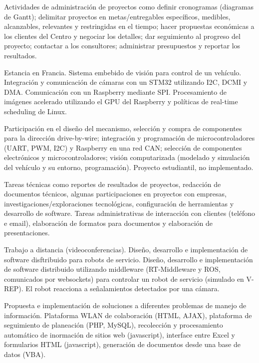 \documentclass[11pt,a4paper,sans]{moderncv}	%
\begin{document}
{Actividades de administración de proyectos como definir cronogramas (diagramas de Gantt); delimitar proyectos en metas/entregables específicos, medibles, alcanzables, relevantes y restringidas en el tiempo; hacer propuestas económicas a los clientes del Centro y negociar los detalles; dar seguimiento al progreso del proyecto; contactar a los consultores; administrar presupuestos y reportar los resultados.}

{Estancia en Francia. Sistema embebido de visión para control de un vehículo. Integración y comunicación de cámaras con un STM32 utilizando I2C, DCMI y DMA. Comunicación con un Raspberry mediante SPI. Procesamiento de imágenes acelerado utilizando el GPU del Raspberry y políticas de real-time scheduling de Linux.}

{Participación en el diseño del mecanismo, selección y compra de componentes para la dirección drive-by-wire; integración y programación de microcontroladores (UART, PWM, I2C) y Raspberry en una red CAN; selección de componentes electrónicos y microcontroladores; visión computarizada (modelado y simulación del vehículo y su entorno, programación). Proyecto estudiantil, no implementado.}

{Tareas técnicas como reportes de resultados de proyectos, redacción de documentos técnicos, algunas participaciones en proyectos con empresas, investigaciones/exploraciones tecnológicas, configuración de herramientas y desarrollo de software. Tareas administrativas de interacción con clientes (teléfono e email), elaboración de formatos para documentos y elaboración de presentaciones.}

{Trabajo a distancia (videoconferencias). Diseño, desarrollo e implementación de software disftribuido para robots de servicio. Diseño, desarrollo e implementación de software distribuido utilizando middleware (RT-Middleware y ROS, comunicados por websockets) para controlar un robot de servicio (simulado en V-REP). El robot reacciona a señalamientos detectados por una cámara.}

{Propuesta e implementación de soluciones a diferentes problemas de manejo de información. Plataforma WLAN de colaboración (HTML, AJAX), plataforma de seguimiento de planeación (PHP, MySQL), recolección y procesamiento automático de inormación de sitios web (javascript), interface entre Excel y formularios HTML (javascript), generación de documentos desde una base de datos (VBA).}
\end{document}
